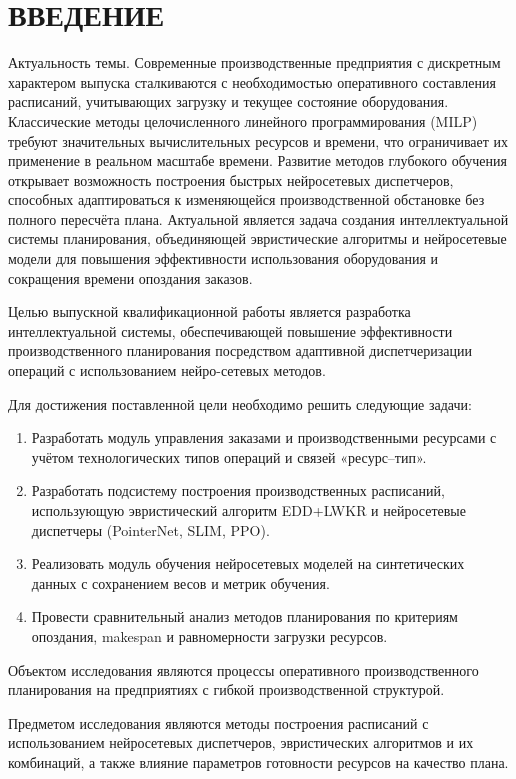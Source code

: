 \section*{ВВЕДЕНИЕ}

Актуальность темы. Современные производственные предприятия с дискретным характером выпуска сталкиваются с необходимостью оперативного составления расписаний, учитывающих загрузку и текущее состояние оборудования. Классические методы целочисленного линейного программирования (MILP) требуют значительных вычислительных ресурсов и времени, что ограничивает их применение в реальном масштабе времени. Развитие методов глубокого обучения открывает возможность построения быстрых нейросетевых диспетчеров, способных адаптироваться к изменяющейся производственной обстановке без полного пересчёта плана. Актуальной является задача создания интеллектуальной системы планирования, объединяющей эвристические алгоритмы и нейросетевые модели для повышения эффективности использования оборудования и сокращения времени опоздания заказов.

Целью выпускной квалификационной работы является разработка интеллектуальной системы, обеспечивающей повышение эффективности производственного планирования посредством адаптивной диспетчеризации операций с использованием нейро-сетевых методов.

Для достижения поставленной цели необходимо решить следующие задачи:
\begin{enumerate}
    \item Разработать модуль управления заказами и производственными ресурсами с учётом технологических типов операций и связей «ресурс–тип».
    \item Разработать подсистему построения производственных расписаний, использующую эвристический алгоритм EDD+LWKR и нейросетевые диспетчеры (PointerNet, SLIM, PPO).
    \item Реализовать модуль обучения нейросетевых моделей на синтетических данных с сохранением весов и метрик обучения.
    \item Провести сравнительный анализ методов планирования по критериям опоздания, makespan и равномерности загрузки ресурсов.
\end{enumerate}

Объектом исследования являются процессы оперативного производственного планирования на предприятиях с гибкой производственной структурой.

Предметом исследования являются методы построения расписаний с использованием нейросетевых диспетчеров, эвристических алгоритмов и их комбинаций, а также влияние параметров готовности ресурсов на качество плана.

